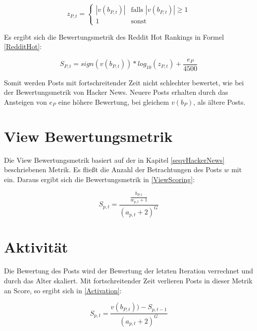 \begin{equation}
\label{RedditHotZ}
z_{P,t}  = \begin{cases}
|v(b_{P,t})| &\text{falls $|v(b_{P,t})| \geq 1$}\\
1 &\text{sonst}
\end{cases}
\end{equation}

Es ergibt sich die Bewertungsmetrik des Reddit Hot Rankings in Formel \ref{RedditHot}:

\begin{equation}
\label{RedditHot}
S_{P,t} = sign(v(b_{P,t})) * log_{10}(z_{P,t}) + \frac{e_{P}}{4500}
\end{equation}

Somit werden Posts mit fortschreitender Zeit nicht schlechter bewertet, wie bei der Bewertungsmetrik von Hacker News. Neuere Posts erhalten durch das Ansteigen von $e_P$ eine höhere Bewertung, bei gleichem $v(b_P)$, als ältere Posts. 
 

\section{View Bewertungsmetrik}

Die View Bewertungsmetrik basiert auf der in Kapitel \ref{seqvHackerNews} beschriebenen Metrik. Es fließt die Anzahl der Betrachtungen des Posts $w$ mit ein. Daraus ergibt sich die Bewertungsmetrik in \ref{ViewScoring}:

\begin{equation}
\label{ViewScoring}
S_{p,t} = \frac{\frac{b_{P,t}}{w_{p,t} + 1}}{(a_{p,t} + 2)^{G}}
\end{equation}




\section{Aktivität}

Die Bewertung des Posts wird der Bewertung der letzten Iteration verrechnet und durch das Alter skaliert. Mit fortschreitender Zeit verlieren Posts in dieser Metrik an Score, so ergibt sich in \ref{Activation}:

\begin{equation}
\label{Activation}
S_{p,t} = \frac{v(b_{P,t})) - S_{p,t-1}}{(a_{p,t} + 2)^{G}}
\end{equation}


